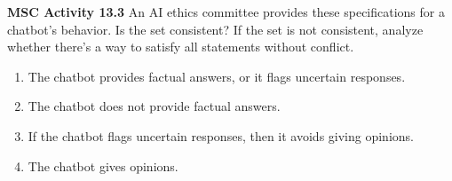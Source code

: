 \documentclass[aspectratio=169]{beamer}
\begin{document}
\begin{frame}[plain]{}

{\bf MSC Activity 13.3} An AI ethics committee provides these specifications for a chatbot’s behavior. Is the set consistent?
If the set is not consistent, analyze whether there’s a way to satisfy all statements without conflict.

 \begin{enumerate}
	\item The chatbot provides factual answers, or it flags uncertain responses.
	\item The chatbot does not provide factual answers.
	\item If the chatbot flags uncertain responses, then it avoids giving opinions.
	\item The chatbot gives opinions.
\end{enumerate}
\vspace{1in}

\end{frame}
\end{document}
